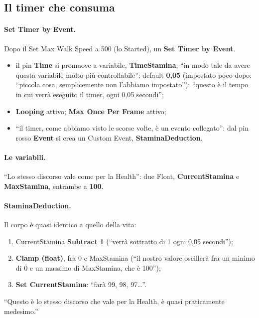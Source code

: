 \subsection{Il timer che consuma}

\paragraph{Set Timer by Event.} Dopo il Set Max Walk Speed a 500 (lo Started), un
\textbf{Set Timer by Event}.
\begin{itemize}
  \item il pin \textbf{Time} si promuove a variabile, \textbf{TimeStamina}, ``in modo tale
        da avere questa variabile molto più controllabile''; default \textbf{0,05}
        (impostato poco dopo: ``piccola cosa, semplicemente non l'abbiamo impostato''):
        ``questo è il tempo in cui verrà eseguito il timer, ogni 0,05 secondi'';
  \item \textbf{Looping} attivo; \textbf{Max Once Per Frame} attivo;
  \item ``il timer, come abbiamo visto le scorse volte, è un evento collegato'': dal pin
        rosso \textbf{Event} si crea un Custom Event, \textbf{StaminaDeduction}.
\end{itemize}

\paragraph{Le variabili.} ``Lo stesso discorso vale come per la Health'': due Float,
\textbf{CurrentStamina} e \textbf{MaxStamina}, entrambe a \textbf{100}.

\paragraph{StaminaDeduction.} Il corpo è quasi identico a quello della vita:
\begin{enumerate}
  \item CurrentStamina \textbf{Subtract} \textbf{1} (``verrà sottratto di 1 ogni 0,05
        secondi'');
  \item \textbf{Clamp (float)}, fra 0 e MaxStamina (``il nostro valore oscillerà fra un
        minimo di 0 e un massimo di MaxStamina, che è 100'');
  \item \textbf{Set CurrentStamina}: ``farà 99, 98, 97\dots''.
\end{enumerate}
``Questo è lo stesso discorso che vale per la Health, è quasi praticamente medesimo.''

